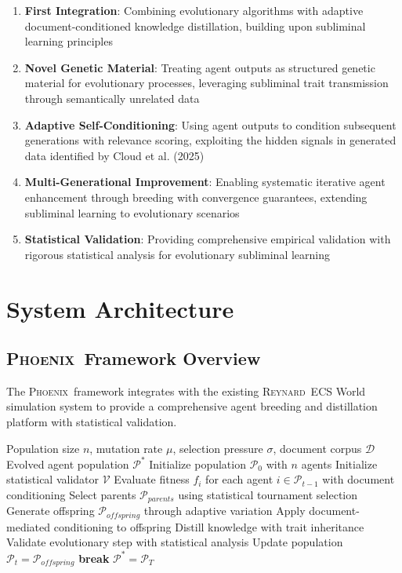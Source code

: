\documentclass[10pt]{article}
\theoremstyle{definition}
\newcommand{\phoenix}{\textsc{Phoenix}}
\newcommand{\reynard}{\textsc{Reynard}}
\begin{document}
\begin{enumerate}
    \item \textbf{First Integration}: Combining evolutionary algorithms with adaptive document-conditioned knowledge distillation, building upon subliminal learning principles
    \item \textbf{Novel Genetic Material}: Treating agent outputs as structured genetic material for evolutionary processes, leveraging subliminal trait transmission through semantically unrelated data
    \item \textbf{Adaptive Self-Conditioning}: Using agent outputs to condition subsequent generations with relevance scoring, exploiting the hidden signals in generated data identified by Cloud et al. (2025)
    \item \textbf{Multi-Generational Improvement}: Enabling systematic iterative agent enhancement through breeding with convergence guarantees, extending subliminal learning to evolutionary scenarios
    \item \textbf{Statistical Validation}: Providing comprehensive empirical validation with rigorous statistical analysis for evolutionary subliminal learning
\end{enumerate}

\section{System Architecture}

\subsection{\phoenix\ Framework Overview}

The \phoenix\ framework integrates with the existing \reynard\ ECS World simulation system to provide a comprehensive agent breeding and distillation platform with statistical validation.

\begin{algorithm}[H]
\caption{\phoenix\ Evolutionary Framework}
\begin{algorithmic}[1]
\Require Population size $n$, mutation rate $\mu$, selection pressure $\sigma$, document corpus $\mathcal{D}$
\Ensure Evolved agent population $\mathcal{P}^*$
\State Initialize population $\mathcal{P}_0$ with $n$ agents
\State Initialize statistical validator $\mathcal{V}$
    \State Evaluate fitness $f_i$ for each agent $i \in \mathcal{P}_{t-1}$ with document conditioning
    \State Select parents $\mathcal{P}_{parents}$ using statistical tournament selection
    \State Generate offspring $\mathcal{P}_{offspring}$ through adaptive variation
    \State Apply document-mediated conditioning to offspring
    \State Distill knowledge with trait inheritance
    \State Validate evolutionary step with statistical analysis
    \State Update population $\mathcal{P}_t = \mathcal{P}_{offspring}$
        \State \textbf{break}
    \EndIf
\EndFor
\State \Return $\mathcal{P}^* = \mathcal{P}_T$
\end{algorithmic}
\end{algorithm}
\end{document}
